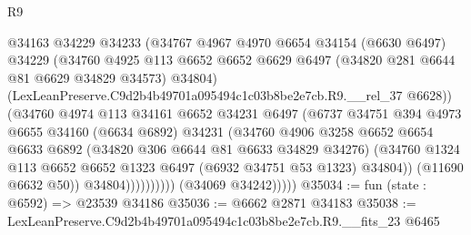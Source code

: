 \begin{lexlean}{R9}
\begin{coremodule}
                              @34163
                              @34229
                              @34233
                              (@34767
                                @4967
                                @4970
                                @6654
                                @34154
                                (@6630 @6497)
                                @34229
                                (@34760
                                  @4925
                                  @113
                                  @6652
                                  @6652
                                  @6629
                                  @6497
                                  (@34820 @281 @6644 @81 @6629 @34829 @34573)
                                  @34804)
                                (LexLeanPreserve.C9d2b4b49701a095494c1c03b8be2e7cb.R9.__rel_37
                                  @6628))
                              (@34760
                                @4974
                                @113
                                @34161
                                @6652
                                @34231
                                @6497
                                (@6737
                                  @34751
                                  @394
                                  @4973
                                  @6655
                                  @34160
                                  (@6634 @6892)
                                  @34231
                                  (@34760
                                    @4906
                                    @3258
                                    @6652
                                    @6654
                                    @6633
                                    @6892
                                    (@34820 @306 @6644 @81 @6633 @34829 @34276)
                                    (@34760
                                      @1324
                                      @113
                                      @6652
                                      @6652
                                      @1323
                                      @6497
                                      (@6932 @34751 @53 @1323)
                                      @34804))
                                  (@11690 @6632 @50))
                                @34804))))))))))
            (@34069 @34242)))))
@35034 := fun (state : @6592) => @23539 @34186
@35036 := @6662 @2871 @34183
@35038 := LexLeanPreserve.C9d2b4b49701a095494c1c03b8be2e7cb.R9.__fits_23 @6465

\end{coremodule}
\end{lexlean}

